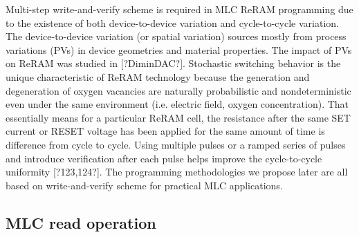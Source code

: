 Multi-step write-and-verify scheme is required in MLC ReRAM programming due to the existence of  both device-to-device variation and cycle-to-cycle variation. The device-to-device variation (or spatial variation) sources mostly from process variations (PVs) in device geometries and material properties. The impact of PVs on ReRAM was studied in [?DiminDAC?]. Stochastic switching behavior is the unique characteristic of ReRAM technology because the generation and degeneration of oxygen vacancies are naturally probabilistic and nondeterministic even under the same environment (i.e. electric field, oxygen concentration). That essentially means for a particular ReRAM cell, the resistance after the same SET current or RESET voltage has been applied for the same amount of time is difference from cycle to cycle. Using multiple pulses or a ramped series of pulses and introduce verification after each pulse helps improve the cycle-to-cycle uniformity [?123,124?]. The programming methodologies we propose later are all based on write-and-verify scheme for practical MLC applications.

\subsection{MLC read operation}

